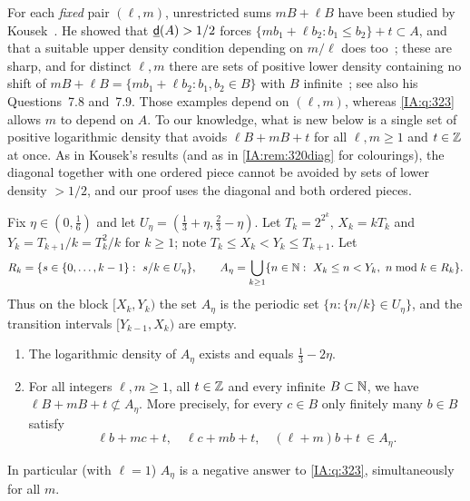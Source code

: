For each \emph{fixed} pair $(\ell,m)$, unrestricted sums $mB+\ell B$ have been studied by
Kousek~\cite{kousek2025asymmetric}. He showed that $\underline{\mathsf{d}}(A)>1/2$ forces
$\{mb_1+\ell b_2:b_1\le b_2\}+t\subset A$, and that a suitable upper density condition depending on
$m/\ell$ does too~\cite[Theorems~1.6 and~1.7]{kousek2025asymmetric}; these are sharp, and for distinct
$\ell,m$ there are sets of positive lower density containing no shift of
$mB+\ell B=\{mb_1+\ell b_2:b_1,b_2\in B\}$ with $B$ infinite~\cite[Propositions~5.1, 6.5, 7.6
and~7.7]{kousek2025asymmetric}; see also his Questions~7.8 and~7.9. Those examples depend on
$(\ell,m)$, whereas \cref{IA:q:323} allows $m$ to depend on $A$. To our knowledge, what is new below is a single set of
positive logarithmic density that avoids $\ell B+mB+t$ for all $\ell,m\ge1$ and $t\in\mathbb{Z}$ at once. As in
Kousek's results (and as in \cref{IA:rem:320diag} for colourings), the diagonal together with one
ordered piece cannot be avoided by sets of lower density $>1/2$, and our proof uses the diagonal and
both ordered pieces.

Fix $\eta\in(0,\frac16)$ and let $U_\eta=(\frac13+\eta,\frac23-\eta)$. Let $T_k=2^{2^k}$,
$X_k=kT_k$ and $Y_k=T_{k+1}/k=T_k^2/k$ for $k\ge1$; note $T_k\le X_k<Y_k\le T_{k+1}$. Let
\[
R_k=\{s\in\{0,\dots,k-1\}:\ s/k\in U_\eta\},\qquad
A_\eta=\bigcup_{k\ge1}\{n\in\mathbb{N}:\ X_k\le n<Y_k,\ n\bmod k\in R_k\}.
\]
Thus on the block $[X_k,Y_k)$ the set $A_\eta$ is the periodic set $\{n:\{n/k\}\in U_\eta\}$, and
the transition intervals $[Y_{k-1},X_k)$ are empty.

\begin{theorem}\label{IA:thm:323}
\begin{enumerate}[label=\textup{(\alph*)}]
\item\label{IA:it:323dens} The logarithmic density of $A_\eta$ exists and equals $\frac13-2\eta$.
\item\label{IA:it:323avoid} For all integers $\ell,m\ge1$, all $t\in\mathbb{Z}$ and every infinite
$B\subset\mathbb{N}$, we have $\ell B+mB+t\not\subset A_\eta$. More precisely, for every $c\in B$ only
finitely many $b\in B$ satisfy
\[
\ell b+mc+t,\quad \ell c+mb+t,\quad (\ell+m)b+t\ \in A_\eta .
\]
\end{enumerate}
In particular (with $\ell=1$) $A_\eta$ is a negative answer to \cref{IA:q:323}, simultaneously for
all $m$.
\end{theorem}

